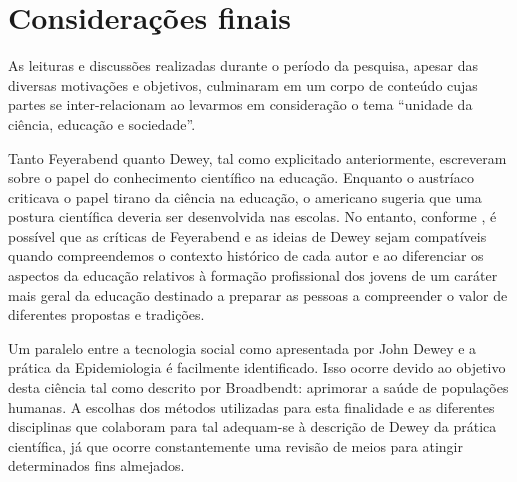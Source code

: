 \documentclass[12pt]{report}
\begin{document}
	\vspace*{-0.6cm}
	\chapter*{Considerações finais}
	\vspace*{-0.75cm}
	
	As leituras e discussões realizadas durante o período da pesquisa, apesar das diversas motivações e objetivos, culminaram em um corpo de conteúdo cujas partes se inter-relacionam ao levarmos em consideração o tema ``unidade da ciência, educação e sociedade''.
	
	Tanto Feyerabend quanto Dewey, tal como explicitado anteriormente, escreveram sobre o papel do conhecimento científico na educação.
	Enquanto o austríaco criticava o papel tirano da ciência na educação, o americano sugeria que uma postura científica deveria ser desenvolvida nas escolas.
	No entanto, conforme \textcite{cunha_sci_and_edu}, é possível que as críticas de Feyerabend e as ideias de Dewey sejam compatíveis quando compreendemos o contexto histórico de cada autor e ao diferenciar os aspectos da educação relativos à formação profissional dos jovens de um caráter mais geral da educação destinado a preparar as pessoas a compreender o valor de diferentes propostas e tradições.
	
	Um paralelo entre a tecnologia social como apresentada por John Dewey e a prática da Epidemiologia é facilmente identificado.
	Isso ocorre devido ao objetivo desta ciência tal como descrito por Broadbendt: aprimorar a saúde de populações humanas.
	A escolhas dos métodos utilizadas para esta finalidade e as diferentes disciplinas que colaboram para tal adequam-se à descrição de Dewey da prática científica, já que ocorre constantemente uma revisão de meios para atingir determinados fins almejados.
	
\end{document}
